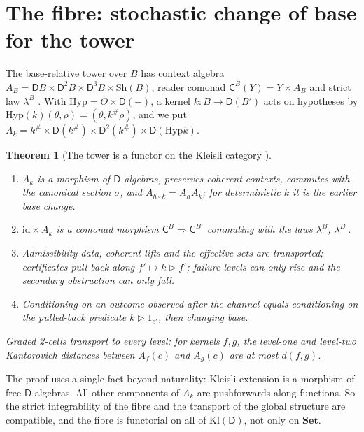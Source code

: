 \documentclass[11pt]{article}
\newtheorem{theorem}{Theorem}[section]
\theoremstyle{definition}
\theoremstyle{remark}
\newcommand{\D}{\mathsf{D}}
\newcommand{\Kl}{\mathrm{Kl}}
\newcommand{\Hyp}{\mathrm{Hyp}}
\newcommand{\Sh}{\mathrm{Sh}}
\newcommand{\C}{\mathsf{C}}
\newcommand{\id}{\mathrm{id}}
\begin{document}
\section{The fibre: stochastic change of base for the tower}\label{sec:fibre}

The base-relative tower over $B$ has context algebra $A_B=\D B\times\D^2B\times\D^3B\times\Sh(B)$,
reader comonad $\C^B(Y)=Y\times A_B$ and strict law $\lambda^B$ \cite[\S9]{Awasthi-Tower}. With
$\Hyp=\Theta\times\D(-)$, a kernel $k\colon B\to\D(B')$ acts on hypotheses by
$\Hyp(k)(\theta,\rho)=(\theta,k^\#\rho)$, and we put
$A_k=k^\#\times\D(k^\#)\times\D^2(k^\#)\times\D(\Hyp k)$.

\begin{theorem}[The tower is a functor on the Kleisli category {\cite[Prop.~9.14, Cor.~9.15, Prop.~9.16]{Awasthi-Tower}}]\label{thm:fibre}
\leavevmode
\begin{enumerate}[label=(\roman*)]
\item $A_k$ is a morphism of $\D$-algebras, preserves coherent contexts, commutes with the canonical
  section $\sigma$, and $A_{h\circ k}=A_hA_k$; for deterministic $k$ it is the earlier base change.
\item $\id\times A_k$ is a comonad morphism $\C^B\Rightarrow\C^{B'}$ commuting with the laws $\lambda^B$,
  $\lambda^{B'}$.
\item Admissibility data, coherent lifts and the effective sets are transported; certificates pull
  back along $f'\mapsto k\rhd f'$; failure levels can only rise and the secondary obstruction can only
  fall.
\item Conditioning on an outcome observed after the channel equals conditioning on the pulled-back
  predicate $k\rhd1_{e'}$, then changing base.
\end{enumerate}
Graded 2-cells transport to every level: for kernels $f,g$, the level-one and level-two Kantorovich
distances between $A_f(c)$ and $A_g(c)$ are at most $d(f,g)$.
\end{theorem}

The proof uses a single fact beyond naturality: Kleisli extension is a morphism of free $\D$-algebras.
All other components of $A_k$ are pushforwards along functions. So the strict integrability of the
fibre and the transport of the global structure are compatible, and the fibre is functorial on all
of $\Kl(\D)$, not only on $\mathbf{Set}$.
\end{document}
